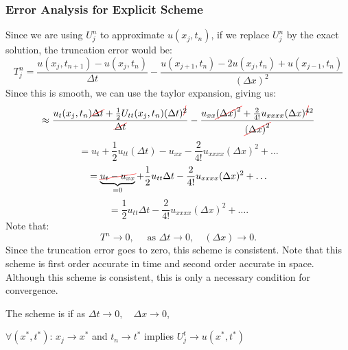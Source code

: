 \documentclass[../main/main.tex]{subfiles}
\begin{document}
\subsubsection{Error Analysis for Explicit Scheme}
Since we are using $U_j^n$ to approximate $u(x_j,t_n)$, if we replace $U_j^n$ by the exact solution, the truncation error would be: \begin{equation}
    \label{9_10_truncation}
    T^n_j = \frac{u(x_j, t_{n+1})- u(x_j,t_n)}{\Delta t} - \frac{u(x_{j+1},t_n) - 2u(x_j,t_n) + u(x_{j-1},t_n)}{\left( \Delta x \right) ^2}
    \end{equation} Since this is smooth, we can use the taylor expansion, giving us: \[
\approx \frac{u_t(x_j,t_n)\Ccancel[red]{\Delta t} + \frac{1}{2}U_{tt}(x_j,t_n)(\Delta t)^{\Ccancel[red]{2}}}{\Ccancel[red]{\Delta t}} - \frac{u_{x x} \Ccancel[red]{\left( \Delta x \right)^2} + \frac{2}{4!}u_{x x x x} (\Delta x)^{\Ccancel[red]{4}2}}{\Ccancel[red]{\left( \Delta x \right)^2}}
\] \[
= u_t + \frac{1}{2} u_{ t t}(\Delta t) - u_{x x} - \frac{2}{4!} u_{x x x x} (\Delta x)^2 + \ldots
\] \[
= \underbrace{\Ccancel[red]{u_t - u_{x x}}}_{=0} + \frac{1}{2}u_{t t} \Delta t - \frac{2}{4!} u_{x x x x}(\Delta x)^2 + \ldots
\] \[ 
= \frac{1}{2}u_{t t} \Delta t - \frac{2}{4!} u_{x x x x}(\Delta x)^2 + \ldots
.\] 
Note that: \[
    T^n \to  0, \quad\text{ as }\Delta t \to  0, \quad (\Delta x) \to  0
.\] Since the truncation error goes to zero, this scheme is consistent. Note that this scheme is first order accurate in time and second order accurate in space. Although this scheme is consistent, this is only a necessary condition for convergence.

\begin{definition}
    The scheme is  if as $\Delta t \to  0, \quad \Delta x \to  0$,

    $\forall (x^{*},t ^{*})$: $x_j \to  x^*$ and $t_n \to  t^*$ implies $U_j^t \to  u(x^*, t^*)$
\end{definition}
\end{document}
